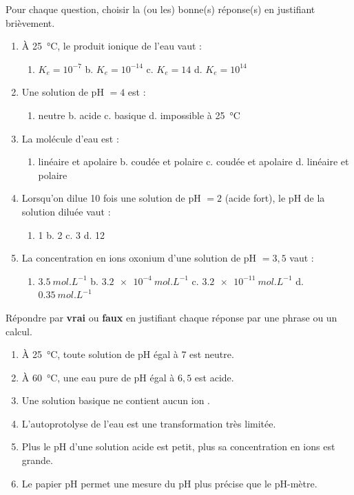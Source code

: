 \documentclass[11pt]{article}
\begin{document}
\begin{exercice}
Pour chaque question, choisir la (ou les) bonne(s) réponse(s) en justifiant brièvement.
\begin{enumerate}
\item À \SI{25}{\celsius}, le produit ionique de l'eau vaut :
\begin{enumerate}
    \item[a.] $K_e = 10^{-7}$ \quad b. $K_e = 10^{-14}$ \quad c. $K_e = 14$ \quad d. $K_e = 10^{14}$
\end{enumerate}
\item Une solution de pH $= 4$ est :
\begin{enumerate}
    \item[a.] neutre \quad b. acide \quad c. basique \quad d. impossible à \SI{25}{\celsius}
\end{enumerate}
\item La molécule d'eau est :
\begin{enumerate}
    \item[a.] linéaire et apolaire \quad b. coudée et polaire \quad c. coudée et apolaire \quad d. linéaire et polaire
\end{enumerate}
\item Lorsqu'on dilue 10 fois une solution de pH $= 2$ (acide fort), le pH de la solution diluée vaut :
\begin{enumerate}
    \item[a.] 1 \quad b. 2 \quad c. 3 \quad d. 12
\end{enumerate}
\item La concentration en ions oxonium d'une solution de pH $= 3{,}5$ vaut :
\begin{enumerate}
    \item[a.] $\SI{3,5}{mol.L^{-1}}$ \quad b. $\SI{3,2e-4}{mol.L^{-1}}$ \quad c. $\SI{3,2e-11}{mol.L^{-1}}$ \quad d. $\SI{0,35}{mol.L^{-1}}$
\end{enumerate}
\end{enumerate}
\end{exercice}

\begin{exercice}
Répondre par \textbf{vrai} ou \textbf{faux} en justifiant chaque réponse par une phrase ou un calcul.
\begin{enumerate}
\item À \SI{25}{\celsius}, toute solution de pH égal à 7 est neutre.
\item À \SI{60}{\celsius}, une eau pure de pH égal à $6{,}5$ est acide.
\item Une solution basique ne contient aucun ion .
\item L'autoprotolyse de l'eau est une transformation très limitée.
\item Plus le pH d'une solution acide est petit, plus sa concentration en ions  est grande.
\item Le papier pH permet une mesure du pH plus précise que le pH-mètre.
\end{enumerate}
\end{exercice}
\end{document}
